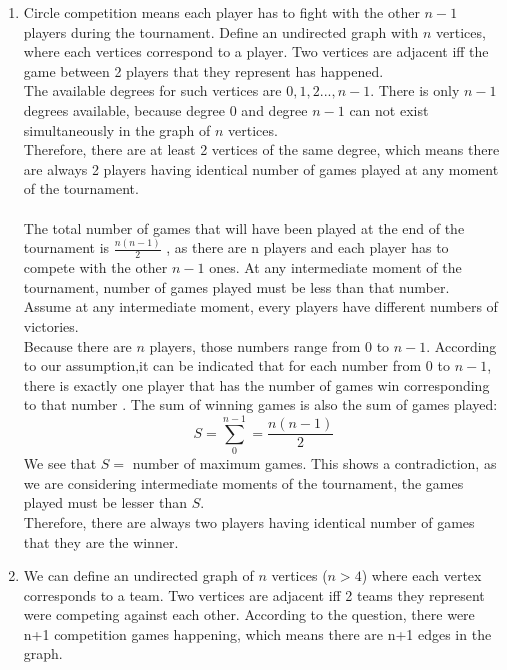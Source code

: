 \documentclass[a4paper]{article}
\begin{document}
	\begin{enumerate}
	    \item Circle competition means each player has to fight with the other $n-1$ players during the tournament. Define an undirected graph with $n$ vertices, where each vertices correspond to a player. Two vertices are adjacent iff the game between 2 players that they represent has happened. \\
	    The available degrees for such vertices are $0,1,2...,n-1$. There is only $n-1$ degrees available, because degree 0 and degree $n-1$ can not exist simultaneously in the graph of $n$ vertices. \\
	    Therefore, there are at least 2 vertices of the same degree, which means there are always 2 players having identical number of games played at any moment of the tournament. \\ \\
	    The total number of games that will have been played at the end of the tournament is $\frac{n(n-1)}{2}$ , as there are n players and each player has to compete with the other $n-1$ ones. At any intermediate moment of the tournament, number of games played must be less than that number. \\
	    Assume at any intermediate moment, every players have different numbers of victories.\\
	    Because there are $n$ players, those numbers range from 0 to $n-1$. According to our assumption,it can be indicated that for each number from 0 to $n-1$, there is exactly one player that has the number of games win corresponding to that number . The sum of winning games is also the sum of games played:
	    \begin{equation*}
	        S = \sum_{0}^{n-1} = \frac{n(n-1)}{2}
	    \end{equation*}
	    We see that $S =$ number of maximum games. This shows a contradiction, as we are considering intermediate moments of the tournament, the games played must be lesser than $S$. \\
	    Therefore, there are always two players having identical number of games that they are the winner.
	    \item We can define an undirected graph of $n$ vertices ($n > 4$) where each vertex corresponds to a team. Two vertices are adjacent iff 2 teams they represent were competing against each other. According to the question, there were n+1 competition games happening, which means there are n+1 edges in the graph. \\

\end{enumerate}
\end{document}
